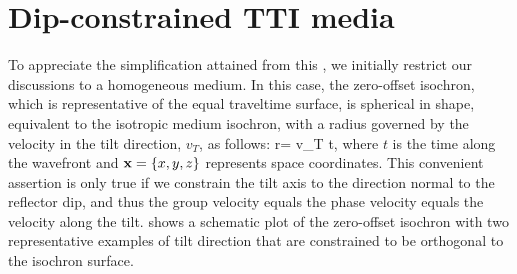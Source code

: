 

\section{Dip-constrained TTI media}

To appreciate the simplification attained from this  , we
initially restrict our discussions to a homogeneous medium. In this
case, the zero-offset isochron, which is representative of the equal
traveltime surface, is spherical in shape, equivalent to the isotropic
medium isochron, with a radius governed by the velocity in the tilt
direction, $v_T$, as follows:
%
\beq \label{eq:ttime}
  r\ofx = v_T t\ofx,
\eeq
%
where $t$ is the time along the wavefront and ${\bf x}=\{x,y,z\}$
represents space coordinates. This convenient assertion is only true if
we constrain the tilt axis to the direction normal to the reflector
dip, and thus the group velocity equals the phase velocity equals the
velocity along the tilt.  shows a schematic plot of the
zero-offset isochron with two representative examples of tilt
direction that are constrained to be orthogonal to the isochron
surface. 

